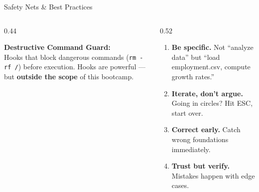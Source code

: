 \documentclass[aspectratio=169, 10pt]{beamer}
\begin{document}
\begin{frame}{Safety Nets \& Best Practices}
\begin{columns}[T]
\begin{column}{0.44\textwidth}
\begin{tcolorbox}[keybox, title={\faLock\quad Safety}]
\scriptsize
\textbf{Destructive Command Guard:}\\
Hooks that block dangerous commands (\texttt{rm -rf /}) before execution.
\vskip3pt
Hooks are powerful --- but \textbf{outside the scope} of this bootcamp.
\end{tcolorbox}
\end{column}
\begin{column}{0.52\textwidth}
\begin{tcolorbox}[keybox, title={\faLightbulb\quad Four Prompting Rules}]
\scriptsize
\begin{enumerate}\setlength{\itemsep}{1pt}
  \item \textbf{Be specific.}
    {\tiny Not ``analyze data'' but ``load employment.csv, compute growth rates.''}
  \item \textbf{Iterate, don't argue.}
    {\tiny Going in circles? Hit ESC, start over.}
  \item \textbf{Correct early.}
    {\tiny Catch wrong foundations immediately.}
  \item \textbf{Trust but verify.}
    {\tiny Mistakes happen with edge cases.}
\end{enumerate}
\end{tcolorbox}
\end{column}
\end{columns}
\end{frame}
\end{document}

